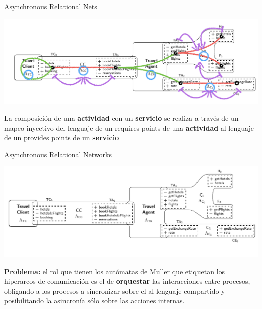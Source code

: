 \documentclass[10pt,xcolor={table,dvipsnames},t]{beamer}
\begin{document}
\begin{frame}{Asynchronous Relational Nets \cite{fiadeiro:fase2011}}
 \vspace{\fill}
\begin{center}
\includegraphics[scale=0.39]{images/ARN8.png}
\end{center}
 \vspace{\fill}
La composición de una \textbf{actividad} con un \textbf{servicio} se realiza a través de un \textcolor{map}{mapeo inyectivo} del lenguaje de un \textcolor{req}{requires points} de una \textbf{actividad} al lenguaje de un \textcolor{prov}{provides points} de un \textbf{servicio}
 \vspace{\fill}
\end{frame}


\begin{frame}{Asynchronous Relational Networks}
 \vspace{\fill}
\begin{center}
 \includegraphics[scale=0.45]{images/ARN9.png}
\end{center}   
 \vspace{\fill}
\textbf{Problema:} el rol que tienen los autómatas de Muller que etiquetan los hiperarcos de comunicación es el de \textbf{orquestar} las interacciones entre procesos, obligando a los procesos a sincronizar sobre el al lenguaje compartido y posibilitando la asincronía sólo sobre las acciones internas.
 \vspace{\fill}
\end{frame}
\end{document}
